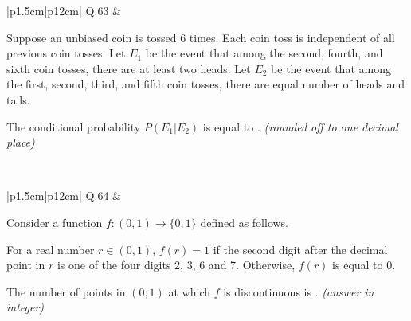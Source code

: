 \documentclass[14pt]{article}
\begin{document}
\begin{tabular}{|p{1.5cm}|p{12cm}|}
\hline
Q.63 &
\parbox[t]{\linewidth}{
Suppose an unbiased coin is tossed 6 times. Each coin toss is independent of all previous coin tosses. Let $E_1$ be the event that among the second, fourth, and sixth coin tosses, there are at least two heads. Let $E_2$ be the event that among the first, second, third, and fifth coin tosses, there are equal number of heads and tails.

\vspace{0.3cm}

The conditional probability $P(E_1|E_2)$ is equal to \underline{\hspace{2cm}}. \textit{(rounded off to one decimal place)}

\vspace{0.35cm}
}
\\
\hline
\end{tabular}


\vspace{0.3cm}

\begin{tabular}{|p{1.5cm}|p{12cm}|}
\hline
Q.64 &
\parbox[t]{\linewidth}{
Consider a function $f:(0,1)\rightarrow\{0,1\}$ defined as follows.

\vspace{0.3cm}

For a real number $r \in (0,1)$, $f(r)=1$ if the second digit after the decimal point in $r$ is one of the four digits 2, 3, 6 and 7. Otherwise, $f(r)$ is equal to 0.

\vspace{0.2cm}

The number of points in $(0,1)$ at which $f$ is discontinuous is \underline{\hspace{2cm}}. \textit{(answer in integer)}

\vspace{0.35cm}
}
\\
\hline
\end{tabular}

\vspace{0.3cm}
\end{document}
